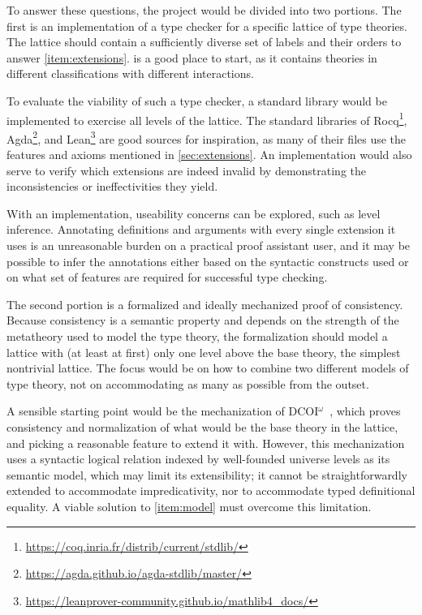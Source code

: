 \documentclass{article}
\begin{document}
To answer these questions, the project would be divided into two portions.
The first is an implementation of a type checker for a specific lattice of type theories.
The lattice should contain a sufficiently diverse set of labels and their orders
to answer \cref{item:extensions}.
 is a good place to start,
as it contains theories in different classifications with different interactions.

To evaluate the viability of such a type checker,
a standard library would be implemented to exercise all levels of the lattice.
The standard libraries of Rocq\footnote{\url{https://coq.inria.fr/distrib/current/stdlib/}},
Agda\footnote{\url{https://agda.github.io/agda-stdlib/master/}},
and Lean\footnote{\url{https://leanprover-community.github.io/mathlib4_docs/}}
are good sources for inspiration,
as many of their files use the features and axioms mentioned in \cref{sec:extensions}.
An implementation would also serve to verify which extensions are indeed invalid
by demonstrating the inconsistencies or ineffectivities they yield.

With an implementation, useability concerns can be explored,
such as level inference.
Annotating definitions and arguments with every single extension it uses
is an unreasonable burden on a practical proof assistant user,
and it may be possible to infer the annotations
either based on the syntactic constructs used
or on what set of features are required for successful type checking.

The second portion is a formalized and ideally mechanized proof of consistency.
Because consistency is a semantic property and depends on the strength
of the metatheory used to model the type theory,
the formalization should model a lattice with (at least at first)
only one level above the base theory, the simplest nontrivial lattice.
The focus would be on how to combine two different models of type theory,
not on accommodating as many as possible from the outset.

A sensible starting point would be the mechanization of DCOI$^\omega$~\cite{dcoi-omega},
which proves consistency and normalization of what would be the base theory in the lattice,
and picking a reasonable feature to extend it with.
However, this mechanization uses a syntactic logical relation
indexed by well-founded universe levels as its semantic model,
which may limit its extensibility;
it cannot be straightforwardly extended to accommodate impredicativity,
nor to accommodate typed definitional equality.
A viable solution to \cref{item:model} must overcome this limitation.
\end{document}
